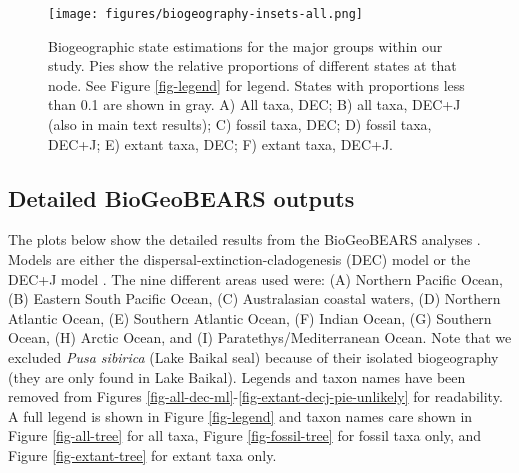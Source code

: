 \documentclass[a4paper, 12pt]{article}
\begin{document}
\begin{figure}[H]
 \centering
  \texttt{[image: figures/biogeography-insets-all.png]}
  \caption{Biogeographic state estimations for the major groups within our study. Pies show the relative proportions of different states at that node. See Figure \ref{fig-legend} for legend. States with proportions less than 0.1 are shown in gray. A) All taxa, DEC; B) all taxa, DEC+J (also in main text results); C) fossil taxa, DEC; D) fossil taxa, DEC+J; E) extant taxa, DEC; F) extant taxa, DEC+J.}
  \label{fig-nodes}
\end{figure} 



\subsection{Detailed BioGeoBEARS outputs}

The plots below show the detailed results from the BioGeoBEARS analyses \cite{matzke2013probabilistic}. Models are either the dispersal-extinction-cladogenesis (DEC) model \cite{ree2008maximum} or the DEC+J model \cite{matzke2014model}. 
The nine different areas used were: (A) Northern Pacific Ocean, (B) Eastern South Pacific Ocean, (C) Australasian coastal waters, (D) Northern Atlantic Ocean, (E) Southern Atlantic Ocean, (F) Indian Ocean, (G) Southern Ocean, (H) Arctic Ocean, and (I) Paratethys/Mediterranean Ocean. Note that we excluded \textit{Pusa sibirica} (Lake Baikal seal) because of their isolated biogeography (they are only found in Lake Baikal). 
Legends and taxon names have been removed from Figures \ref{fig-all-dec-ml}-\ref{fig-extant-decj-pie-unlikely} for readability. 
A full legend is shown in Figure \ref{fig-legend} and taxon names care shown in Figure \ref{fig-all-tree} for all taxa, Figure \ref{fig-fossil-tree} for fossil taxa only, and Figure \ref{fig-extant-tree} for extant taxa only.
\end{document}
